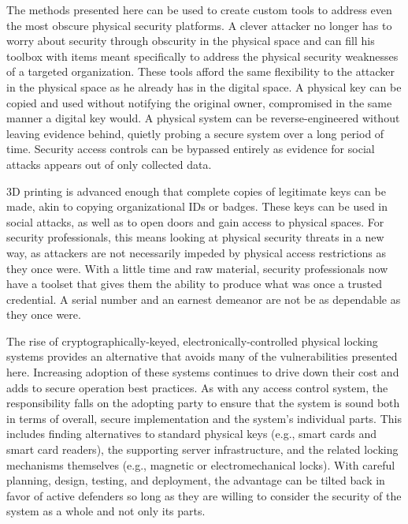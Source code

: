 \documentclass{acm_proc_article-sp}
\begin{document}
The methods presented here can be used to create custom tools to address even the most obscure physical security platforms. A clever attacker no longer has to worry about security through obscurity in the physical space and can fill his toolbox with items meant specifically to address the physical security weaknesses of a targeted organization. These tools afford the same flexibility to the attacker in the physical space as he already has in the digital space. A physical key can be copied and used without notifying the original owner, compromised in the same manner a digital key would. A physical system can be reverse-engineered without leaving evidence behind, quietly probing a secure system over a long period of time. Security access controls can be bypassed entirely as evidence for social attacks appears out of only collected data.

3D printing is advanced enough that complete copies of legitimate keys can be made, akin to copying organizational IDs or badges. These keys can be used in social attacks, as well as to open doors and gain access to physical spaces. For security professionals, this means looking at physical security threats in a new way, as attackers are not necessarily impeded by physical access restrictions as they once were. With a little time and raw material, security professionals now have a toolset that gives them the ability to produce what was once a trusted credential. A serial number and an earnest demeanor are not be as dependable as they once were.

The rise of cryptographically-keyed, electronically-controlled physical locking systems provides an alternative that avoids many of the vulnerabilities presented here. Increasing adoption of these systems continues to drive down their cost and adds to
secure operation best practices.
As with any access control system, the responsibility falls on the adopting party to ensure that the system is sound both in terms of overall, secure implementation and the system's individual parts. This includes finding alternatives to standard physical keys (e.g., smart cards and smart card readers), the supporting server infrastructure, and the related
locking mechanisms themselves (e.g., magnetic or electromechanical locks).
With careful planning, design, testing, and deployment, the advantage can be tilted back in favor of active defenders so long as they are willing to consider the security of the system as a whole and not only its parts.



\nocite{*}
\balancecolumns
\end{document}
